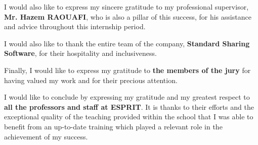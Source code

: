 I would also like to express my sincere gratitude to my professional supervisor, \textbf{Mr. Hazem RAOUAFI}, who is also a pillar of this success, for his assistance and advice throughout this internship period.\bigskip

I would also like to thank the entire team of the company, \textbf{Standard Sharing Software}, for their hospitality and inclusiveness.\bigskip

Finally, I would like to express my gratitude to \textbf{the members of the jury} for having valued my work and for their precious attention.\bigskip

I would like to conclude by expressing my gratitude and my greatest respect to \textbf{all the professors and staff at ESPRIT}. It is thanks to their efforts and the exceptional quality of the teaching provided within the school that I was able to benefit from an up-to-date training which played a relevant role in the achievement of my success.